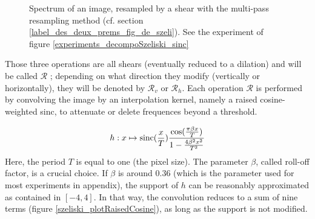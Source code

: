 \begin{figure}
		\caption{Spectrum of an image, resampled by a shear with the multi-pass resampling method (cf. section \ref{label_des_deux_prems_fig_de_szeli}). See the experiment of figure \ref{experiments_decompoSzeliski_sinc} }
		\label{szeliski_decompoSzeliski}
	\end{figure}
	
	
\noindent 	Those three operations are all shears (eventually reduced to a dilation) and will be called $\mathcal R$ ; depending on what direction they modify (vertically or horizontally), they will be denoted by $\mathcal R_v$ or $\mathcal R_h$. Each operation $\mathcal R$ is performed by convolving the image by an interpolation kernel, namely a raised cosine-weighted sinc, to attenuate or delete frequences beyond a threshold.
	
	\begin{equation}
	h : x \mapsto \operatorname{sinc}(\frac{x}{T})\frac{\cos(\frac{\pi\beta x}{T})}{1-\frac{4\beta^2x^2}{T^2}}
	\label{szeliski_definition_raisedCosineWeightedSinc}
	\end{equation}
	Here, the period $T$ is equal to one (the pixel size).
	The parameter $\beta$, called roll-off factor, is a crucial choice. If $\beta$ is around $0.36$ (which is the parameter used for most experiments in appendix), the support of $h$ can be reasonably approximated as contained in $[-4,4]$. In that way, the convolution reduces to a sum of nine terms (figure \ref{szeliski_plotRaisedCosine}), as long as the support is not modified.
	
